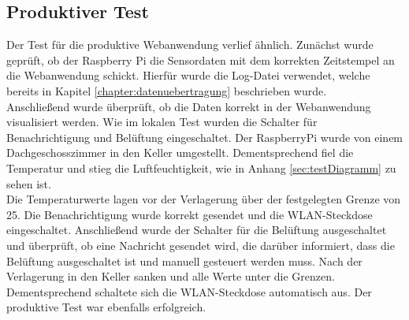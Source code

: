 \documentclass[conference]{IEEEtran}
\begin{document}
\subsection{Produktiver Test}
Der Test für die produktive Webanwendung verlief ähnlich. Zunächst wurde geprüft, ob der Raspberry Pi die Sensordaten mit dem korrekten Zeitstempel an die Webanwendung schickt. Hierfür wurde die Log-Datei verwendet, welche bereits in Kapitel \ref{chapter:datenuebertragung}
beschrieben wurde. \\
Anschließend wurde überprüft, ob die Daten korrekt in der Webanwendung visualisiert werden. Wie im lokalen Test wurden die Schalter für Benachrichtigung und Belüftung eingeschaltet. Der RaspberryPi wurde von einem Dachgeschosszimmer in den Keller umgestellt. Dementsprechend fiel die Temperatur und stieg die Luftfeuchtigkeit, wie in Anhang \ref{sec:testDiagramm} zu sehen ist. \\
Die Temperaturwerte lagen vor der Verlagerung über der festgelegten Grenze von 25. Die Benachrichtigung wurde korrekt gesendet und die WLAN-Steckdose eingeschaltet. Anschließend wurde der Schalter für die Belüftung ausgeschaltet und überprüft, ob eine Nachricht gesendet wird, die darüber informiert, dass die Belüftung ausgeschaltet ist und manuell gesteuert werden muss. Nach der Verlagerung in den Keller sanken und alle Werte unter die Grenzen. Dementsprechend schaltete sich die WLAN-Steckdose automatisch aus. Der produktive Test war ebenfalls erfolgreich.
\end{document}

